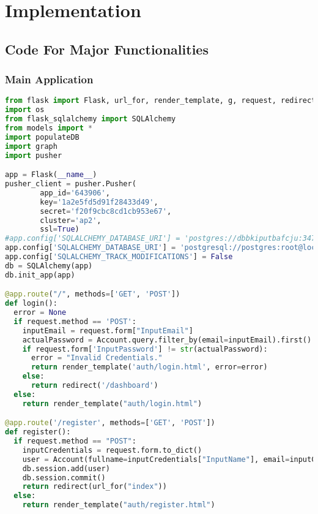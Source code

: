 \chapter{Implementation}

\section{Code For Major Functionalities}
\subsection{Main Application}
\thispagestyle{fancy}
\begin{lstlisting}[language=Python]
from flask import Flask, url_for, render_template, g, request, redirect, Markup, json
import os
from flask_sqlalchemy import SQLAlchemy
from models import *
import populateDB
import graph
import pusher

app = Flask(__name__)
pusher_client = pusher.Pusher(
        app_id='643906',
        key='1a2e5fd5d91f28433d49',
        secret='f20f9cbc8cd1cb953e67',
        cluster='ap2',
        ssl=True)
#app.config['SQLALCHEMY_DATABASE_URI'] = 'postgres://dbbkiputbafcju:3477b7be42046136fa9d2dec76b7b397933f1314dcbf136a64e1d1288185663a@ec2-54-83-29-34.compute-1.amazonaws.com:5432/d78tp1vprns7ma?sslmode=require'
app.config['SQLALCHEMY_DATABASE_URI'] = 'postgresql://postgres:root@localhost:5432/apms'
app.config['SQLALCHEMY_TRACK_MODIFICATIONS'] = False
db = SQLAlchemy(app)
db.init_app(app)

@app.route("/", methods=['GET', 'POST'])
def login():
  error = None
  if request.method == 'POST':
    inputEmail = request.form["InputEmail"]
    actualPassword = Account.query.filter_by(email=inputEmail).first()
    if request.form['InputPassword'] != str(actualPassword):
      error = "Invalid Credentials."
      return render_template('auth/login.html', error=error)
    else:
      return redirect('/dashboard')
  else:
    return render_template("auth/login.html")

@app.route('/register', methods=['GET', 'POST'])
def register():
  if request.method == "POST":
    inputCredentials = request.form.to_dict()
    user = Account(fullname=inputCredentials["InputName"], email=inputCredentials["InputEmail"], password=inputCredentials["InputPassword"])
    db.session.add(user)
    db.session.commit()
    return redirect(url_for("index"))
  else:
    return render_template("auth/register.html")


\end{lstlisting}
